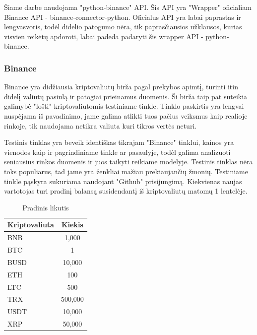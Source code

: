 \documentclass{VUMIFInfKursinis}
\begin{document}
Šiame darbe naudojama "python-binance" API. Šis API yra "Wrapper" oficialiam Binance API - binance-connector-python. 
Oficialus API yra labai paprastas ir lengvasvoris, todėl didelio patogumo nėra, tik paprasčiausios užklausos,
kurias visvien reikėtų apdoroti, labai padeda padaryti šis wrapper API - python-binance.

\subsubsection{Binance}
Binance yra didžiausia kriptovaliutų birža pagal prekybos apimtį, turinti itin didelį valiutų pasiulą ir patogiai prieinamus duomenis. Ši birža taip pat
suteikia galimybė "lošti" kriptovaliutomis testiniame tinkle. Tinklo paskirtis yra lengvai nuspėjama iš pavadinimo, jame galima atlikti tuos pačius 
veiksmus kaip realioje rinkoje, tik naudojama netikra valiuta kuri tikros vertės neturi.

Testinis tinklas yra beveik identiškas tikrajam "Binance" tinklui, kainos yra vienodos kaip ir pagrindiniame tinkle ar pasaulyje, todėl galima analizuoti 
seniausius rinkos duomenis ir juos taikyti reikiame modelyje. Testinis tinklas nėra toks populiarus, tad jame yra ženkliai mažiau prekiaujančių žmonių. 
Testiniame tinkle pąskyra sukuriama naudojant "Github" prisijungimą. Kiekvienas naujas vartotojas turi pradinį balansą susidendantį iš kriptovaliutų
matomų 1 lentelėje.

\begin{table}[H]\footnotesize
  \centering
  \caption{Pradinis likutis}
  {\begin{tabular}{|l|c|} \hline
      Kriptovaliuta & Kiekis  \\
      \hline
      BNB           & 1,000   \\
      BTC           & 1       \\
      BUSD          & 10,000  \\
      ETH           & 100     \\
      LTC           & 500     \\
      TRX           & 500,000 \\
      USDT          & 10,000  \\
      XRP           & 50,000  \\
      \hline 
    \end{tabular}}
\end{table}
\end{document}
